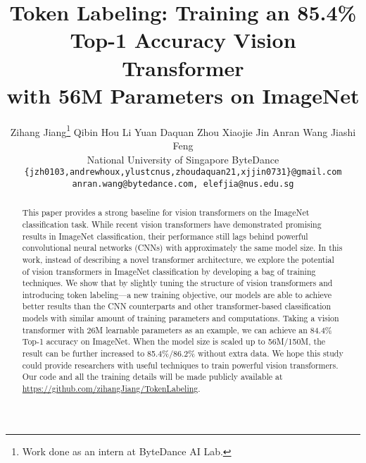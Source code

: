 \documentclass[10pt,twocolumn,letterpaper]{article}
\begin{document}
\title{Token Labeling: Training an 85.4\% Top-1 Accuracy Vision Transformer \\
with 56M Parameters on ImageNet}

\author{Zihang Jiang\thanks{Work done as an intern at ByteDance AI Lab.} \quad Qibin Hou \quad Li Yuan \quad Daquan Zhou  \quad Xiaojie Jin \quad Anran Wang \quad Jiashi Feng\\
National University of Singapore  \quad ByteDance \\
{\tt\small \{jzh0103,andrewhoux,ylustcnus,zhoudaquan21,xjjin0731\}@gmail.com} \\
{\tt\small anran.wang@bytedance.com, elefjia@nus.edu.sg}
}

\maketitle
\ificcvfinal\thispagestyle{empty}\fi

\begin{abstract}
This paper provides a strong baseline for vision transformers on the ImageNet classification task.
While recent vision transformers have demonstrated promising results in ImageNet classification, 
their performance still lags behind powerful convolutional neural networks (CNNs)
with approximately the same model size.
In this work, instead of describing a novel transformer architecture,
we explore the potential of vision transformers in ImageNet classification
by developing a bag of training techniques.
We show that by slightly tuning the structure of vision transformers and introducing token labeling---a
new training objective, our models are able to achieve better results than the CNN counterparts 
and other transformer-based classification models with similar amount of training parameters and computations.
Taking a vision transformer with 26M learnable parameters as an example, we can achieve 
an 84.4\% Top-1 accuracy on ImageNet.
When the model size is scaled up to 56M/150M, the result can be further increased to 85.4\%/86.2\% without extra data. 
We hope this study could provide researchers with useful techniques to train powerful vision transformers.
Our code and all the training details will be made publicly available at \url{https://github.com/zihangJiang/TokenLabeling}.

\end{abstract}
\end{document}
